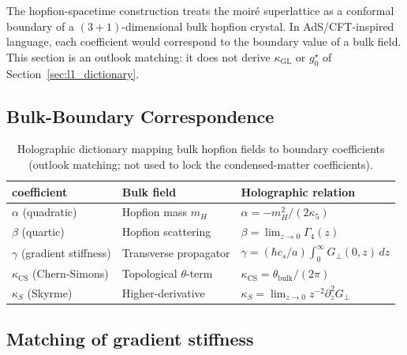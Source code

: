 \documentclass[11pt,letterpaper]{article}
\begin{document}
The hopfion-spacetime construction treats the \TEVC{} moir\'e superlattice as a conformal boundary of a $(3+1)$-dimensional bulk hopfion crystal. In AdS/CFT-inspired language, each \TQGL{} coefficient would correspond to the boundary value of a bulk field. This section is an outlook matching: it does not derive $\kappa_{\mathrm{GL}}$ or $g_0^\star$ of Section~\ref{sec:l1_dictionary}.

\subsection{Bulk-Boundary Correspondence}

\begin{table}[htbp]
\centering
\caption{Holographic dictionary mapping bulk hopfion fields to boundary \TQGL{} coefficients (outlook matching; not used to lock the condensed-matter coefficients).}
\begin{tabular}{lll}
\toprule
\textbf{\TQGL{} coefficient} & \textbf{Bulk field} & \textbf{Holographic relation} \\
\midrule
$\alpha$ (quadratic) & Hopfion mass $m_H$ & $\alpha = -m_H^2/(2\kappa_5)$ \\
$\beta$ (quartic) & Hopfion scattering & $\beta = \lim_{z\to 0} \Gamma_4(z)$ \\
$\gamma$ (gradient stiffness) & Transverse propagator & $\gamma = (\hbar c_s/a)\int_0^\infty G_\perp(0,z)\,dz$ \\
$\kappa_{\text{CS}}$ (Chern-Simons) & Topological $\theta$-term & $\kappa_{\text{CS}} = \theta_{\text{bulk}}/(2\pi)$ \\
$\kappa_S$ (Skyrme) & Higher-derivative & $\kappa_S = \lim_{z\to 0} z^{-2} \partial_z^2 G_\perp$ \\
\bottomrule
\end{tabular}
\label{tab:holographic}
\end{table}

\subsection{Matching of gradient stiffness}
\end{document}
